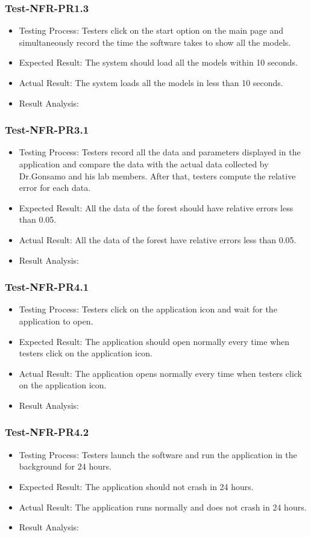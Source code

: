 \documentclass[12pt, titlepage]{article}
\begin{document}
\subsubsection{Test-NFR-PR1.3}
\begin{itemize}
    \item Testing Process: Testers click on the start option on the main page and simultaneously record the time the software takes to show all the models.
    \item Expected Result: The system should load all the models within 10 seconds.
    \item Actual Result: The system loads all the models in less than 10 seconds.
    \item Result Analysis: \pass
\end{itemize}
\subsubsection{Test-NFR-PR3.1}
\begin{itemize}
    \item Testing Process: Testers record all the data and parameters displayed in the application and compare the data with the actual data collected by Dr.Gonsamo and his lab members. After that, testers compute the relative error for each data.
    \item Expected Result: All the data of the forest should have relative errors less than 0.05.
    \item Actual Result: All the data of the forest have relative errors less than 0.05.
    \item Result Analysis: \pass
\end{itemize}
\subsubsection{Test-NFR-PR4.1}
\begin{itemize}
    \item Testing Process: Testers click on the application icon and wait for the application to open.
    \item Expected Result: The application should open normally every time when testers click on the application icon.
    \item Actual Result: The application opens normally every time when testers click on the application icon.
    \item Result Analysis: \pass
\end{itemize}
\subsubsection{Test-NFR-PR4.2}
\begin{itemize}
    \item Testing Process: Testers launch the software and run the application in the background for 24 hours.
    \item Expected Result: The application should not crash in 24 hours.  
    \item Actual Result: The application runs normally and does not crash in 24 hours.
    \item Result Analysis: \pass
\end{itemize}
\end{document}
